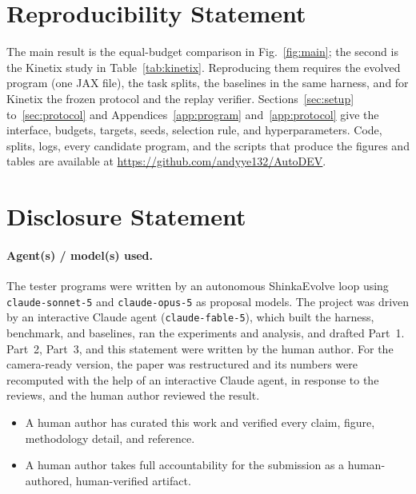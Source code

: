 \documentclass{article}
\begin{document}
\section{Reproducibility Statement}
The main result is the equal-budget comparison in Fig.~\ref{fig:main}; the second is the Kinetix study in
Table~\ref{tab:kinetix}. Reproducing them requires the evolved program (one JAX file), the task splits, the baselines in
the same harness, and for Kinetix the frozen protocol and the replay verifier. Sections~\ref{sec:setup}
to~\ref{sec:protocol} and Appendices~\ref{app:program} and~\ref{app:protocol} give the interface, budgets, targets, seeds,
selection rule, and hyperparameters. Code, splits, logs, every candidate program, and the scripts that produce the figures
and tables are available at \url{https://github.com/andyye132/AutoDEV}.

\section{Disclosure Statement}

\paragraph{Agent(s) / model(s) used.}
The tester programs were written by an autonomous ShinkaEvolve loop using \texttt{claude-sonnet-5} and
\texttt{claude-opus-5} as proposal models. The project was driven by an interactive Claude agent (\texttt{claude-fable-5}),
which built the harness, benchmark, and baselines, ran the experiments and analysis, and drafted Part~1. Part~2, Part~3,
and this statement were written by the human author. For the camera-ready version, the paper was restructured and its
numbers were recomputed with the help of an interactive Claude agent, in response to the reviews, and the human author
reviewed the result.

\begin{itemize}
  \item[$\boxtimes$] A human author has curated this work and verified every claim,
    figure, methodology detail, and reference.
  \item[$\boxtimes$] A human author takes full accountability for the submission as
    a human-authored, human-verified artifact.
\end{itemize}


\end{document}
